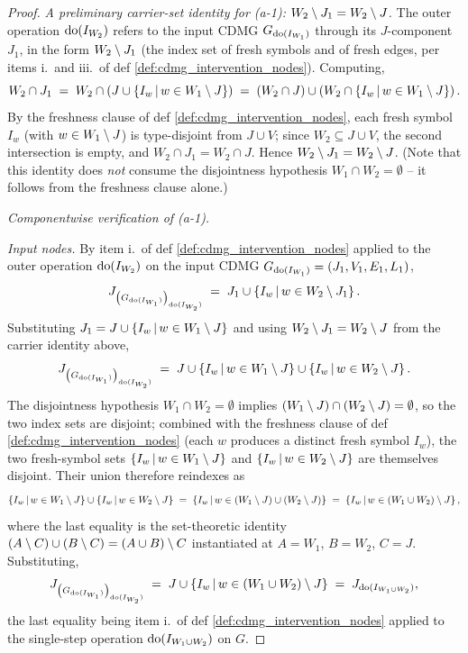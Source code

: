 \documentclass[main]{subfiles}
\begin{document}
\begin{proof}
\smallskip\noindent\emph{A preliminary carrier-set identity for (a-1): $W_2 \setminus J_1 = W_2 \setminus J$.}
The outer operation $\operatorname{do}(I_{W_2})$ refers to the input CDMG $G_{\operatorname{do}(I_{W_1})}$ through its $J$-component $J_1$, in the form $W_2 \setminus J_1$ (the index set of fresh symbols and of fresh edges, per items i.\ and iii.\ of def \ref{def:cdmg_intervention_nodes}). Computing,
\[
    W_2 \cap J_1 \;=\; W_2 \cap \left ( J \cup \left \{ I_w \,\middle|\, w \in W_1 \setminus J \right \} \right ) \;=\; (W_2 \cap J) \cup \left ( W_2 \cap \left \{ I_w \,\middle|\, w \in W_1 \setminus J \right \} \right ).
\]
By the freshness clause of def \ref{def:cdmg_intervention_nodes}, each fresh symbol $I_w$ (with $w \in W_1 \setminus J$) is type-disjoint from $J \cup V$; since $W_2 \subseteq J \cup V$, the second intersection is empty, and $W_2 \cap J_1 = W_2 \cap J$. Hence $W_2 \setminus J_1 = W_2 \setminus J$. (Note that this identity does \emph{not} consume the disjointness hypothesis $W_1 \cap W_2 = \emptyset$ -- it follows from the freshness clause alone.)

\smallskip\noindent\emph{Componentwise verification of (a-1).}

\medskip\noindent\emph{Input nodes.}
By item i.\ of def \ref{def:cdmg_intervention_nodes} applied to the outer operation $\operatorname{do}(I_{W_2})$ on the input CDMG $G_{\operatorname{do}(I_{W_1})} = (J_1, V_1, E_1, L_1)$,
\[
    J_{\left ( G_{\operatorname{do}(I_{W_1})} \right )_{\operatorname{do}(I_{W_2})}} \;=\; J_1 \cup \left \{ I_w \,\middle|\, w \in W_2 \setminus J_1 \right \}.
\]
Substituting $J_1 = J \cup \left \{ I_w \,\middle|\, w \in W_1 \setminus J \right \}$ and using $W_2 \setminus J_1 = W_2 \setminus J$ from the carrier identity above,
\[
    J_{\left ( G_{\operatorname{do}(I_{W_1})} \right )_{\operatorname{do}(I_{W_2})}} \;=\; J \cup \left \{ I_w \,\middle|\, w \in W_1 \setminus J \right \} \cup \left \{ I_w \,\middle|\, w \in W_2 \setminus J \right \}.
\]
The disjointness hypothesis $W_1 \cap W_2 = \emptyset$ implies $(W_1 \setminus J) \cap (W_2 \setminus J) = \emptyset$, so the two index sets are disjoint; combined with the freshness clause of def \ref{def:cdmg_intervention_nodes} (each $w$ produces a distinct fresh symbol $I_w$), the two fresh-symbol sets $\left \{ I_w \,\middle|\, w \in W_1 \setminus J \right \}$ and $\left \{ I_w \,\middle|\, w \in W_2 \setminus J \right \}$ are themselves disjoint. Their union therefore reindexes as
\[
    \left \{ I_w \,\middle|\, w \in W_1 \setminus J \right \} \cup \left \{ I_w \,\middle|\, w \in W_2 \setminus J \right \} \;=\; \left \{ I_w \,\middle|\, w \in (W_1 \setminus J) \cup (W_2 \setminus J) \right \} \;=\; \left \{ I_w \,\middle|\, w \in (W_1 \cup W_2) \setminus J \right \},
\]
where the last equality is the set-theoretic identity $(A \setminus C) \cup (B \setminus C) = (A \cup B) \setminus C$ instantiated at $A = W_1$, $B = W_2$, $C = J$. Substituting,
\[
    J_{\left ( G_{\operatorname{do}(I_{W_1})} \right )_{\operatorname{do}(I_{W_2})}} \;=\; J \cup \left \{ I_w \,\middle|\, w \in (W_1 \cup W_2) \setminus J \right \} \;=\; J_{\operatorname{do}(I_{W_1 \cup W_2})},
\]
the last equality being item i.\ of def \ref{def:cdmg_intervention_nodes} applied to the single-step operation $\operatorname{do}(I_{W_1 \cup W_2})$ on $G$. \checkmark


\end{proof}
\end{document}
